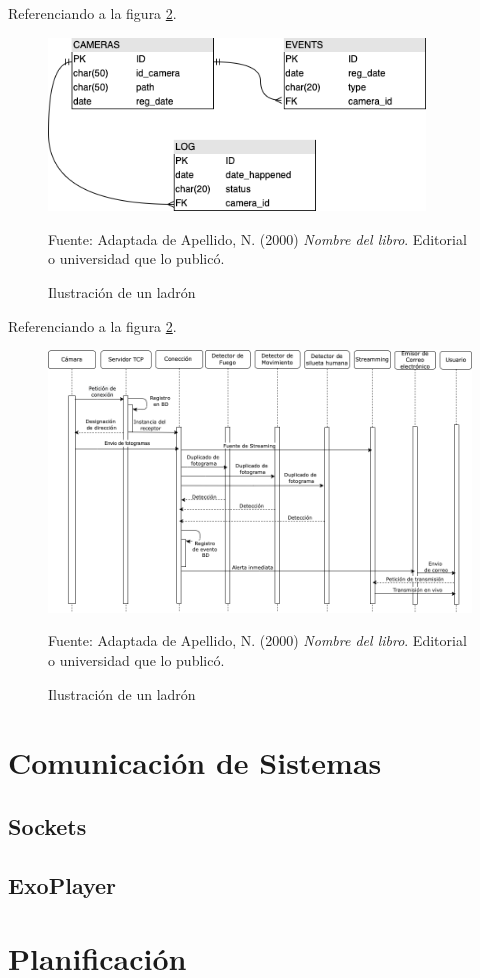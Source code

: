 Referenciando a la figura \ref{fig:ejemplo}.
\begin{figure}[H]
    \begin{center}
        \includegraphics[width=10cm]{img/capitulo_4/db.png}
    \end{center}
    \caption{Ilustración de un ladrón}
    Fuente: Adaptada de Apellido, N. (2000) \textit{Nombre del libro}.
    Editorial o universidad que lo publicó.
    \label{fig:ejemplo}
\end{figure}

Referenciando a la figura \ref{fig:ejemplo}.
\begin{figure}[H]
    \begin{center}
        \includegraphics[width=18cm]{img/capitulo_4/interaccion.png}
    \end{center}
    \caption{Ilustración de un ladrón}
    Fuente: Adaptada de Apellido, N. (2000) \textit{Nombre del libro}.
    Editorial o universidad que lo publicó.
    \label{fig:ejemplo}
\end{figure}
\section{Comunicación de Sistemas}
\subsection{Sockets}

\subsection{ExoPlayer}

\section{Planificación}

